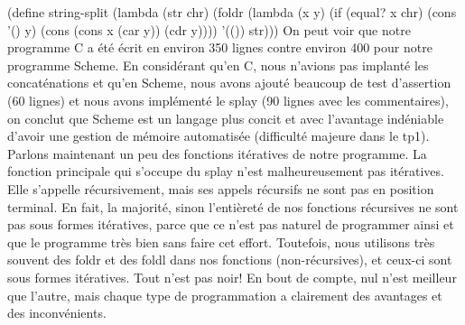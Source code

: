 \documentclass[french]{article}
\begin{document}
				(define string-split
					(lambda (str chr)
						(foldr  
							(lambda (x y)
								(if (equal? x chr) 
									(cons '() y)
									(cons (cons x (car y)) (cdr y))))
							'(()) str)))
				On peut voir que notre programme C a été écrit en environ 350 lignes contre environ 400 pour notre programme Scheme. En considérant qu'en C, nous n'avions pas implanté les concaténations et qu'en Scheme, nous avons ajouté beaucoup de test d'assertion (60 lignes) et nous avons implémenté le splay (90 lignes avec les commentaires), on conclut que Scheme est un langage plus concit et avec l'avantage indéniable d'avoir une gestion de mémoire automatisée (difficulté majeure dans le tp1).
				Parlons maintenant un peu des fonctions itératives de notre programme. La fonction principale qui s'occupe du splay n'est malheureusement pas itératives. Elle s'appelle récursivement, mais ses appels récursifs ne sont pas en position terminal. En fait, la majorité, sinon l'entièreté de nos fonctions récursives ne sont pas sous formes itératives, parce que ce n'est pas naturel de programmer ainsi et que le programme très bien sans faire cet effort. Toutefois, nous utilisons très souvent des foldr et des foldl dans nos fonctions (non-récursives), et ceux-ci sont sous formes itératives. Tout n'est pas noir!
				En bout de compte, nul n'est meilleur que l'autre, mais chaque type de programmation a clairement des avantages et des inconvénients.
		
		
	
\end{document}
